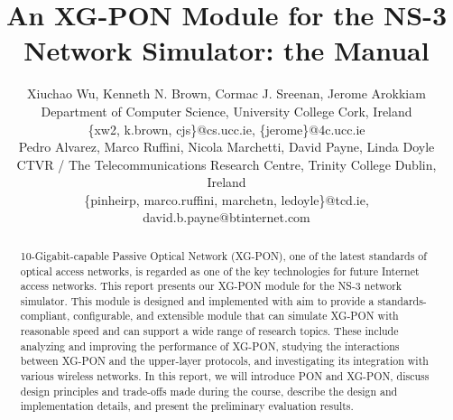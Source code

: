 \documentclass[onecolumn, draftcls]{IEEEtran}
\begin{document}
\title{An XG-PON Module for the NS-3 Network Simulator: the Manual}


\author{
%
%

Xiuchao Wu, Kenneth N. Brown, Cormac J. Sreenan, Jerome Arokkiam\\
 Department of Computer Science, University College Cork, Ireland\\
\{xw2, k.brown, cjs\}@cs.ucc.ie, \{jerome\}@4c.ucc.ie \\\vspace{0.2in}
 Pedro Alvarez, Marco Ruffini, Nicola Marchetti, David Payne, Linda Doyle \\
CTVR / The Telecommunications Research Centre, Trinity College Dublin, Ireland\\
\{pinheirp, marco.ruffini, marchetn, ledoyle\}@tcd.ie, david.b.payne@btinternet.com 
}


\maketitle \thispagestyle{empty}

\begin{abstract}

10-Gigabit-capable Passive Optical Network (XG-PON), one of the
latest standards of optical access networks, is regarded as one of
the key technologies for future Internet access networks. This
report presents our XG-PON module for the NS-3 network simulator.
This module is designed and implemented with aim to provide a
standards-compliant, configurable, and extensible module that can
simulate XG-PON with reasonable speed and can support a wide range
of research topics. These include analyzing and improving the
performance of XG-PON, studying the interactions between XG-PON
and the upper-layer protocols, and investigating its integration
with various wireless networks. In this report, we will introduce
PON and XG-PON, discuss design principles and trade-offs made
during the course, describe the design and implementation details,
and present the preliminary evaluation results.


\end{abstract}
\end{document}
